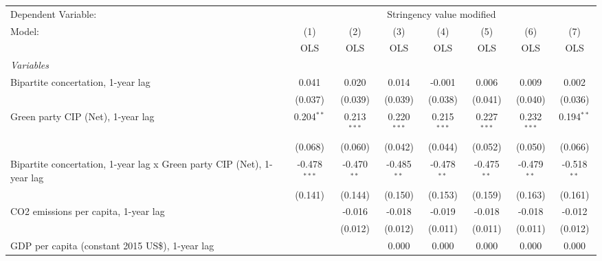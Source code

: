 
\begingroup
\centering
\begin{tabular}{lccccccc}
   \toprule
   Dependent Variable: & \multicolumn{7}{c}{Stringency value modified}\\
   Model:                                                                 & (1)            & (2)           & (3)           & (4)           & (5)           & (6)           & (7)\\  
                                                                          &  OLS           & OLS           & OLS           & OLS           & OLS           & OLS           & OLS\\  
   \midrule
   \emph{Variables}\\
   Bipartite concertation, 1-year lag                                     & 0.041          & 0.020         & 0.014         & -0.001        & 0.006         & 0.009         & 0.002\\   
                                                                          & (0.037)        & (0.039)       & (0.039)       & (0.038)       & (0.041)       & (0.040)       & (0.036)\\   
   Green party CIP (Net), 1-year lag                                      & 0.204$^{**}$   & 0.213$^{***}$ & 0.220$^{***}$ & 0.215$^{***}$ & 0.227$^{***}$ & 0.232$^{***}$ & 0.194$^{**}$\\   
                                                                          & (0.068)        & (0.060)       & (0.042)       & (0.044)       & (0.052)       & (0.050)       & (0.066)\\   
   Bipartite concertation, 1-year lag x Green party CIP (Net), 1-year lag & -0.478$^{***}$ & -0.470$^{**}$ & -0.485$^{**}$ & -0.478$^{**}$ & -0.475$^{**}$ & -0.479$^{**}$ & -0.518$^{**}$\\   
                                                                          & (0.141)        & (0.144)       & (0.150)       & (0.153)       & (0.159)       & (0.163)       & (0.161)\\   
   CO2 emissions per capita, 1-year lag                                   &                & -0.016        & -0.018        & -0.019        & -0.018        & -0.018        & -0.012\\   
                                                                          &                & (0.012)       & (0.012)       & (0.011)       & (0.011)       & (0.011)       & (0.012)\\   
   GDP per capita (constant 2015 US\$), 1-year lag                        &                &               & 0.000         & 0.000         & 0.000         & 0.000         & 0.000\\   

\end{tabular}
